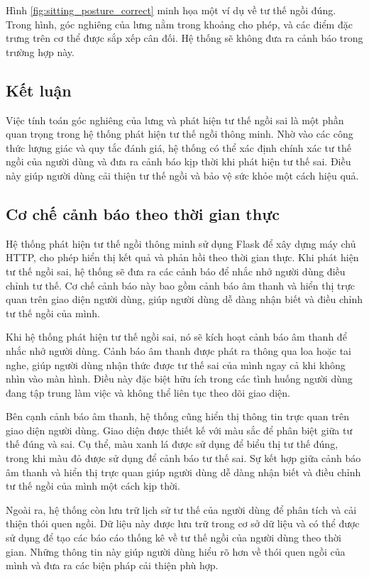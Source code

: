 \documentclass[conference]{IEEEtran}
\begin{document}
Hình \ref{fig:sitting_posture_correct} minh họa một ví dụ về tư thế ngồi đúng. Trong hình, góc nghiêng của lưng nằm trong khoảng cho phép, và các điểm đặc trưng trên cơ thể được sắp xếp cân đối. Hệ thống sẽ không đưa ra cảnh báo trong trường hợp này.

\subsection{Kết luận}
Việc tính toán góc nghiêng của lưng và phát hiện tư thế ngồi sai là một phần quan trọng trong hệ thống phát hiện tư thế ngồi thông minh. Nhờ vào các công thức lượng giác và quy tắc đánh giá, hệ thống có thể xác định chính xác tư thế ngồi của người dùng và đưa ra cảnh báo kịp thời khi phát hiện tư thế sai. Điều này giúp người dùng cải thiện tư thế ngồi và bảo vệ sức khỏe một cách hiệu quả.

\subsection{Cơ chế cảnh báo theo thời gian thực}
Hệ thống phát hiện tư thế ngồi thông minh sử dụng Flask để xây dựng máy chủ HTTP, cho phép hiển thị kết quả và phản hồi theo thời gian thực. Khi phát hiện tư thế ngồi sai, hệ thống sẽ đưa ra các cảnh báo để nhắc nhở người dùng điều chỉnh tư thế. Cơ chế cảnh báo này bao gồm cảnh báo âm thanh và hiển thị trực quan trên giao diện người dùng, giúp người dùng dễ dàng nhận biết và điều chỉnh tư thế ngồi của mình.

Khi hệ thống phát hiện tư thế ngồi sai, nó sẽ kích hoạt cảnh báo âm thanh để nhắc nhở người dùng. Cảnh báo âm thanh được phát ra thông qua loa hoặc tai nghe, giúp người dùng nhận thức được tư thế sai của mình ngay cả khi không nhìn vào màn hình. Điều này đặc biệt hữu ích trong các tình huống người dùng đang tập trung làm việc và không thể liên tục theo dõi giao diện.

Bên cạnh cảnh báo âm thanh, hệ thống cũng hiển thị thông tin trực quan trên giao diện người dùng. Giao diện được thiết kế với màu sắc để phân biệt giữa tư thế đúng và sai. Cụ thể, màu xanh lá được sử dụng để biểu thị tư thế đúng, trong khi màu đỏ được sử dụng để cảnh báo tư thế sai. Sự kết hợp giữa cảnh báo âm thanh và hiển thị trực quan giúp người dùng dễ dàng nhận biết và điều chỉnh tư thế ngồi của mình một cách kịp thời.

Ngoài ra, hệ thống còn lưu trữ lịch sử tư thế của người dùng để phân tích và cải thiện thói quen ngồi. Dữ liệu này được lưu trữ trong cơ sở dữ liệu và có thể được sử dụng để tạo các báo cáo thống kê về tư thế ngồi của người dùng theo thời gian. Những thông tin này giúp người dùng hiểu rõ hơn về thói quen ngồi của mình và đưa ra các biện pháp cải thiện phù hợp.
\end{document}
